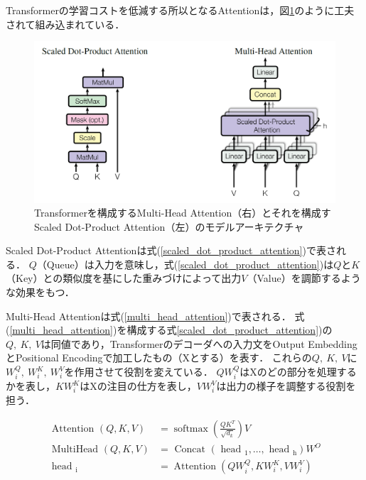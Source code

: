 \documentclass[12pt,a4j]{jreport}
\begin{document}
Transformerの学習コストを低減する所以となるAttentionは，図\ref{fig_attentions-of-transformer}のように工夫されて組み込まれている．

\begin{figure}[H]
	\centering
	\includegraphics[keepaspectratio, width=120mm]{img/attentions-of-transformer.png}
	\caption{Transformerを構成するMulti-Head Attention（右）とそれを構成すScaled Dot-Product Attention（左）のモデルアーキテクチャ\protect\footnotemark[3]}
	\label{fig_attentions-of-transformer}
\end{figure}

Scaled Dot-Product Attentionは式(\ref{scaled_dot_product_attention})で表される．
$Q$（Queue）は入力を意味し，式(\ref{scaled_dot_product_attention})は$Q$と$K$（Key）との類似度を基にした重みづけによって出力$V$（Value）を調節するような効果をもつ．

Multi-Head Attentionは式(\ref{multi_head_attention})で表される．
式(\ref{multi_head_attention})を構成する式\ref{scaled_dot_product_attention})の$Q,~ K,~ V$は同値であり，Transformerのデコーダへの入力文をOutput EmbeddingとPositional Encodingで加工したもの（Xとする）を表す．
これらの$Q,~ K,~ V$に$W_i^Q,~ W_i^K,~ W_i^V$を作用させて役割を変えている．
$QW_i^Q$はXのどの部分を処理するかを表し，$KW_i^K$はXの注目の仕方を表し，$VW_i^V$は出力の様子を調整する役割を担う．

\begin{align}
  \text { Attention }(Q, K, V) &= \operatorname{softmax}\left(\frac{Q K^{T}}{\sqrt{d_{k}}}\right) V
  \label{scaled_dot_product_attention}
  \\
  \text { MultiHead }(Q, K, V) &=\text { Concat }\left(\text { head }_{1}, \ldots, \text { head }_{\mathrm{h}}\right) W^{O}
  \label{multi_head_attention}
  \\
  \text { head }_{\mathrm{i}} &=\operatorname{Attention}\left(Q W_{i}^{Q}, K W_{i}^{K}, V W_{i}^{V}\right)
  \label{substituted_scaled_dot_product_attention}
\end{align}
\end{document}
